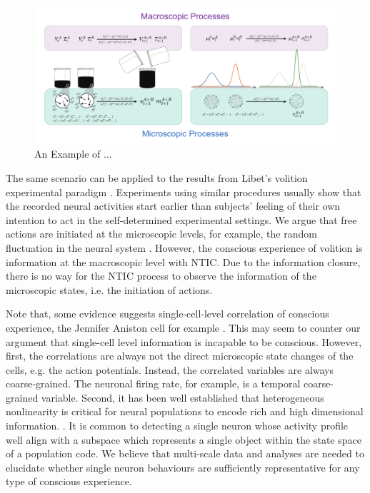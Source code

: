 \documentclass[utf8]{article}
\begin{document}
        
        		\begin{figure}[H]
        			\includegraphics[width=1.3\textwidth]{WritingMaterials/Fig_Temperature_Example/ExampleOfCG.pdf}
        			\centering
        			\caption{An Example of ...}
        			\label{fig:TemperatureExample}
        		\end{figure}         
                
                
                The same scenario can be applied to the results from Libet's volition experimental paradigm \citep{Libet1983TimeOC, Libet1985Dec}. Experiments using similar procedures usually show that the recorded neural activities start earlier than subjects' feeling of their own intention to act in the self-determined experimental settings. We argue that free actions are initiated at the microscopic levels, for example, the random fluctuation in the neural system \citep{schurger_accumulator_2012}. However, the conscious experience of volition is information at the macroscopic level with NTIC. Due to the information closure, there is no way for the NTIC process to observe the information of the microscopic states, i.e. the initiation of actions. 
                
            
                  Note that, some evidence suggests single-cell-level correlation of conscious experience, the Jennifer Aniston cell for example \citep{Quiroga2005Jun, Quiroga2012Jul}. This may seem to counter our argument that single-cell level information is incapable to be conscious. However, first, the correlations are always not the direct microscopic state changes of the cells, e.g. the action potentials. Instead, the correlated variables are always coarse-grained. The neuronal firing rate, for example, is a temporal coarse-grained variable. Second, it has been well established that heterogeneous nonlinearity is critical for neural populations to encode rich and high dimensional information. \citep{Chelaru2008, Rigotti2010Oct, Shamir2004Jun}. It is common to detecting a single neuron whose activity profile well align with a subspace which represents a single object within the state space of a population code. We believe that multi-scale data and analyses are needed to elucidate whether single neuron behaviours are sufficiently representative for any type of conscious experience. 
    
\end{document}
